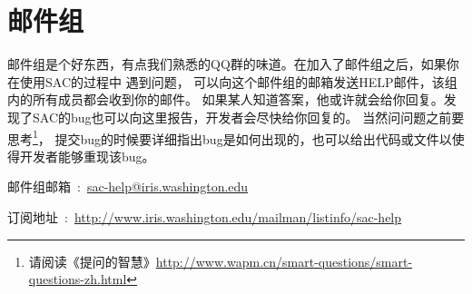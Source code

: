 \section{邮件组}
邮件组是个好东西，有点我们熟悉的QQ群的味道。在加入了邮件组之后，如果你在使用SAC的过程中
遇到问题，
可以向这个邮件组的邮箱发送HELP邮件，该组内的所有成员都会收到你的邮件。
如果某人知道答案，他或许就会给你回复。发现了SAC的bug也可以向这里报告，开发者会尽快给你回复的。
当然问问题之前要思考\footnote{请阅读《提问的智慧》\url{http://www.wapm.cn/smart-questions/smart-questions-zh.html}}，
提交bug的时候要详细指出bug是如何出现的，也可以给出代码或文件以使得开发者能够重现该bug。

邮件组邮箱~:~\url{sac-help@iris.washington.edu}

订阅地址~:~\small{\url{http://www.iris.washington.edu/mailman/listinfo/sac-help}}
